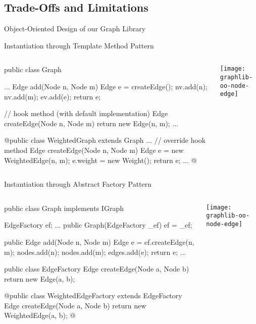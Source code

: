\subsection{Trade-Offs and Limitations}

\begin{frame}{Object-Oriented Design of our Graph Library}
\end{frame}

\begin{frame}[fragile]{Instantiation through Template Method Pattern}
		\begin{columns}
\begin{tiny}
\begin{codetight}{} %
public class Graph {
	...
	Edge add(Node n, Node m) {
		Edge e = createEdge();
		nv.add(n); nv.add(m); ev.add(e);
		return e;
	}
	
	// hook method (with default implementation)
	Edge createEdge(Node n, Node m) {
		return new Edge(n, m);
	}
	...
}
\end{codetight}
\begin{codetight}{}
@public class WeightedGraph extends Graph {
	...
	// override hook method
	Edge createEdge(Node n, Node m) {
		Edge e = new WeightedEdge(n, m);
		e.weight = new Weight();
		return e;
	}
	...
}@
\end{codetight}
\end{tiny}	
				\texttt{[image: graphlib-oo-node-edge]}	
		\end{columns}
\end{frame}

\begin{frame}[fragile]{Instantiation through Abstract Factory Pattern}
		\begin{columns}
			\column{.45\textwidth}
\begin{tiny}
\begin{codetight}{}
public class Graph implements IGraph {
	EdgeFactory ef;
	...
	public Graph(EdgeFactory _ef) {
		ef = _ef;
	}
	
	public Edge add(Node n, Node m) {
		Edge e = ef.createEdge(n, m);
		nodes.add(n); nodes.add(m); edges.add(e);
		return e;
	}
	...
}
\end{codetight}
\begin{codetight}{}
public class EdgeFactory {
	Edge createEdge(Node a, Node b) {
		return new Edge(a, b);
	}
}
\end{codetight}
\begin{codetight}{}
@public class WeightedEdgeFactory extends EdgeFactory {
	Edge createEdge(Node a, Node b) {
		return new WeightedEdge(a, b);
	}
}@
\end{codetight}
\end{tiny}	
			\column{.45\textwidth}
				\texttt{[image: graphlib-oo-node-edge]}	
		\end{columns}
\end{frame}

